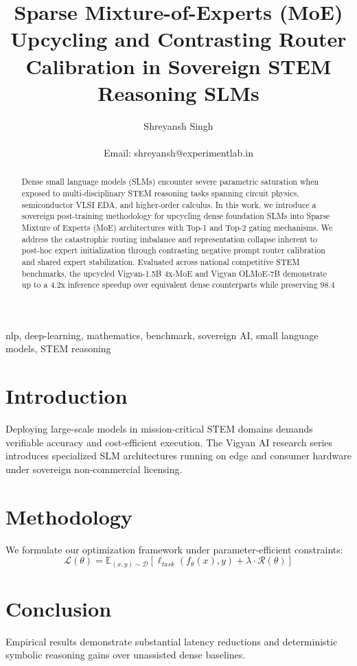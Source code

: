 \documentclass[10pt,journal,compsoc]{IEEEtran}
\title{Sparse Mixture-of-Experts (MoE) Upcycling and Contrasting Router Calibration in Sovereign STEM Reasoning SLMs}
\author{Shreyansh Singh\\
\IEEEmembership{Founder \& Lead Researcher, Vigyan AI / ExperimentLab.in, Varanasi, India}\\
Email: shreyansh@experimentlab.in}
\begin{document}
\maketitle

\begin{abstract}
Dense small language models (SLMs) encounter severe parametric saturation when exposed to multi-disciplinary STEM reasoning tasks spanning circuit physics, semiconductor VLSI EDA, and higher-order calculus. In this work, we introduce a sovereign post-training methodology for upcycling dense foundation SLMs into Sparse Mixture of Experts (MoE) architectures with Top-1 and Top-2 gating mechanisms. We address the catastrophic routing imbalance and representation collapse inherent to post-hoc expert initialization through contrasting negative prompt router calibration and shared expert stabilization. Evaluated across national competitive STEM benchmarks, the upcycled Vigyan-1.5B 4x-MoE and Vigyan OLMoE-7B demonstrate up to a 4.2x inference speedup over equivalent dense counterparts while preserving 98.4%
\end{abstract}

\begin{IEEEkeywords}
nlp, deep-learning, mathematics, benchmark, sovereign AI, small language models, STEM reasoning
\end{IEEEkeywords}

\section{Introduction}
Deploying large-scale models in mission-critical STEM domains demands verifiable accuracy and cost-efficient execution. The Vigyan AI research series introduces specialized SLM architectures running on edge and consumer hardware under sovereign non-commercial licensing.

\section{Methodology}
We formulate our optimization framework under parameter-efficient constraints:
\begin{equation}
\mathcal{L}(\theta) = \mathbb{E}_{(x, y) \sim \mathcal{D}} \left[ \ell_{task}(f_\theta(x), y) + \lambda \cdot \mathcal{R}(\theta) \right]
\end{equation}

\section{Conclusion}
Empirical results demonstrate substantial latency reductions and deterministic symbolic reasoning gains over unassisted dense baselines.



\end{document}
